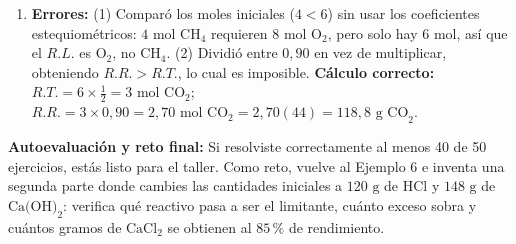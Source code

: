 \documentclass[12pt, letterpaper]{article}
\newcommand{\pc}{\text{\%}}
\begin{document}
\begin{enumerate}[leftmargin=*, label=\textbf{\arabic*.}, start=45]
  \item \textbf{Errores:} (1) Comparó los moles iniciales ($4 < 6$) sin usar los coeficientes estequiométricos: $4\text{ mol CH}_4$ requieren $8\text{ mol O}_2$, pero solo hay $6\text{ mol}$, así que el $R.L.$ es $\text{O}_2$, no $\text{CH}_4$. (2) Dividió entre $0{,}90$ en vez de multiplicar, obteniendo $R.R. > R.T.$, lo cual es imposible. \textbf{Cálculo correcto:} $R.T. = 6\times\frac{1}{2} = 3\text{ mol CO}_2$; $R.R. = 3\times 0{,}90 = 2{,}70\text{ mol CO}_2 = 2{,}70(44) = 118{,}8\text{ g CO}_2$.
\end{enumerate}

\vspace{6pt}
\begin{cuadroextra}
  \small
  \textbf{Autoevaluación y reto final:} Si resolviste correctamente al menos 40 de 50 ejercicios, estás listo para el taller. Como reto, vuelve al Ejemplo 6 e inventa una segunda parte donde cambies las cantidades iniciales a $120\text{ g}$ de $\text{HCl}$ y $148\text{ g}$ de $\text{Ca(OH)}_2$: verifica qué reactivo pasa a ser el limitante, cuánto exceso sobra y cuántos gramos de $\text{CaCl}_2$ se obtienen al $85\,\pc$ de rendimiento.
\end{cuadroextra}

\fi
\end{document}
